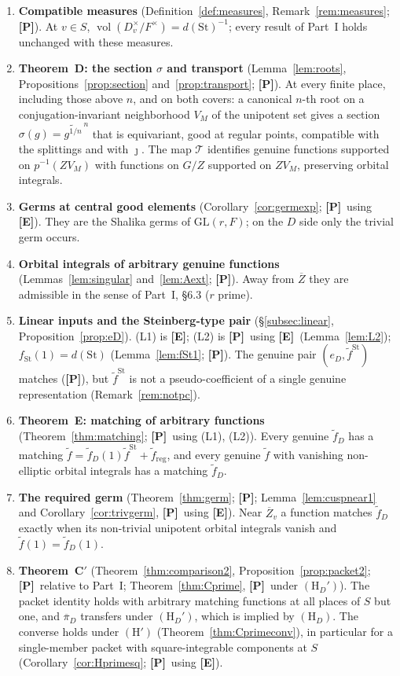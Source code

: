 \documentclass[12pt]{article}
\newcommand{\ov}[1]{\overline{#1}}
\newcommand{\reg}{\mathrm{reg}}
\newcommand{\vol}{\operatorname{vol}}
\newcommand{\GL}{\mathrm{GL}}
\newcommand{\St}{\mathrm{St}}
\newcommand{\Zb}{\ov{Z}}
\newcommand{\pib}{\ov{\pi}}
\newcommand{\jj}{\jmath}
\newcommand{\sg}{\sigma}
\newcommand{\Pv}{\textbf{[P]}}
\newcommand{\Ev}{\textbf{[E]}}
\theoremstyle{plain}
\theoremstyle{definition}
\begin{document}
\begin{enumerate}[leftmargin=*,label=\arabic*.]
\item \textbf{Compatible measures} (Definition~\ref{def:measures}, Remark~\ref{rem:measures}; \Pv). At $v\in S$, $\vol(D_v^\times/F^\times)=d(\St)^{-1}$; every result of Part~I holds unchanged with these measures.
\item \textbf{Theorem~D: the section $\sg$ and transport} (Lemma~\ref{lem:roots}, Propositions~\ref{prop:section} and~\ref{prop:transport}; \Pv). At every finite place, including those above $n$, and on both covers: a canonical $n$-th root on a conjugation-invariant neighborhood $V_M$ of the unipotent set gives a section $\sg(g)=\widetilde{g^{1/n}}^{\,n}$ that is equivariant, good at regular points, compatible with the splittings and with $\jj$. The map $\mathcal T$ identifies genuine functions supported on $p^{-1}(ZV_M)$ with functions on $G/Z$ supported on $ZV_M$, preserving orbital integrals.
\item \textbf{Germs at central good elements} (Corollary~\ref{cor:germexp}; \Pv\ using \Ev). They are the Shalika germs of $\GL(r,F)$; on the $D$ side only the trivial germ occurs.
\item \textbf{Orbital integrals of arbitrary genuine functions} (Lemmas~\ref{lem:singular} and~\ref{lem:Aext}; \Pv). Away from $\Zb$ they are admissible in the sense of Part~I, \S6.3 ($r$ prime).
\item \textbf{Linear inputs and the Steinberg-type pair} (\S\ref{subsec:linear}, Proposition~\ref{prop:eD}). (L1) is \Ev; (L2) is \Pv\ using \Ev\ (Lemma~\ref{lem:L2}); $f_{\St}(1)=d(\St)$ (Lemma~\ref{lem:fSt1}; \Pv). The genuine pair $(e_D,\tilde f^{\St})$ matches (\Pv), but $\tilde f^{\St}$ is not a pseudo-coefficient of a single genuine representation (Remark~\ref{rem:notpc}).
\item \textbf{Theorem~E: matching of arbitrary functions} (Theorem~\ref{thm:matching}; \Pv\ using (L1), (L2)). Every genuine $\tilde f_D$ has a matching $\tilde f=\tilde f_D(1)\tilde f^{\St}+\tilde f_{\reg}$, and every genuine $\tilde f$ with vanishing non-elliptic orbital integrals has a matching $\tilde f_D$.
\item \textbf{The required germ} (Theorem~\ref{thm:germ}; \Pv; Lemma~\ref{lem:cuspnear1} and Corollary~\ref{cor:trivgerm}, \Pv\ using \Ev). Near $\Zb_v$ a function matches $\tilde f_D$ exactly when its non-trivial unipotent orbital integrals vanish and $\tilde f(1)=\tilde f_D(1)$.
\item \textbf{Theorem~C$'$} (Theorem~\ref{thm:comparison2}, Proposition~\ref{prop:packet2}; \Pv\ relative to Part~I; Theorem~\ref{thm:Cprime}, \Pv\ under $(\mathrm H_D')$). The packet identity holds with arbitrary matching functions at all places of $S$ but one, and $\pib_D$ transfers under $(\mathrm H_D')$, which is implied by $(\mathrm H_D)$. The converse holds under $(\mathrm H')$ (Theorem~\ref{thm:Cprimeconv}), in particular for a single-member packet with square-integrable components at $S$ (Corollary~\ref{cor:Hprimesq}; \Pv\ using \Ev).

\end{enumerate}
\end{document}

